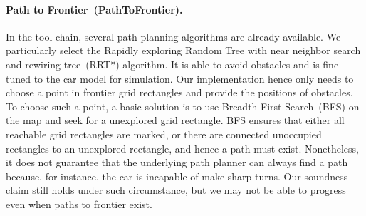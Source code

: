 \paragraph{Path to Frontier~(PathToFrontier).}
In the \toolname tool chain, several path planning algorithms are already available.
We particularly select the Rapidly exploring Random Tree with near neighbor search and rewiring tree~(RRT*) algorithm.
It is able to avoid obstacles and is fine tuned to the car model for simulation.
Our implementation hence only needs to choose a point in frontier grid rectangles and provide the positions of obstacles.
To choose such a point, a basic solution is to use Breadth-First Search~(BFS) on the map and seek for a unexplored grid rectangle.
BFS ensures that either all reachable grid rectangles are marked,
or there are connected unoccupied rectangles to an unexplored rectangle, and hence a path must exist.
Nonetheless, it does not guarantee that the underlying path planner can always find a path because,
for instance, the car is incapable of make sharp turns.
Our soundness claim still holds under such circumstance, but we may not be able to progress even when paths to frontier exist.
